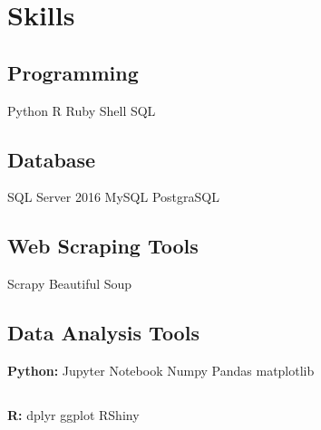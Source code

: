 \documentclass[]{deedy-resume-openfont}
\begin{document}
\begin{minipage}[t]{0.33\textwidth}

\section{Skills}
\subsection{Programming}
\textbullet{} Python \textbullet{} R \textbullet{} Ruby \textbullet{} Shell \textbullet{} SQL \\

\subsection{}
\subsection{Database}
\textbullet{} SQL Server 2016 \textbullet{} MySQL \textbullet{} PostgraSQL \\

\subsection{}
\subsection{Web Scraping Tools}
\textbullet{} Scrapy \textbullet{} Beautiful Soup \\

\subsection{}
\subsection{Data Analysis Tools}
\textbf{Python:} Jupyter Notebook \textbullet{} Numpy \textbullet{} Pandas \textbullet{} matplotlib\\
\subsection{}
\textbf{R:} dplyr \textbullet{} ggplot \textbullet{} RShiny \\ 

\subsection{}

\end{minipage}
\end{document}
